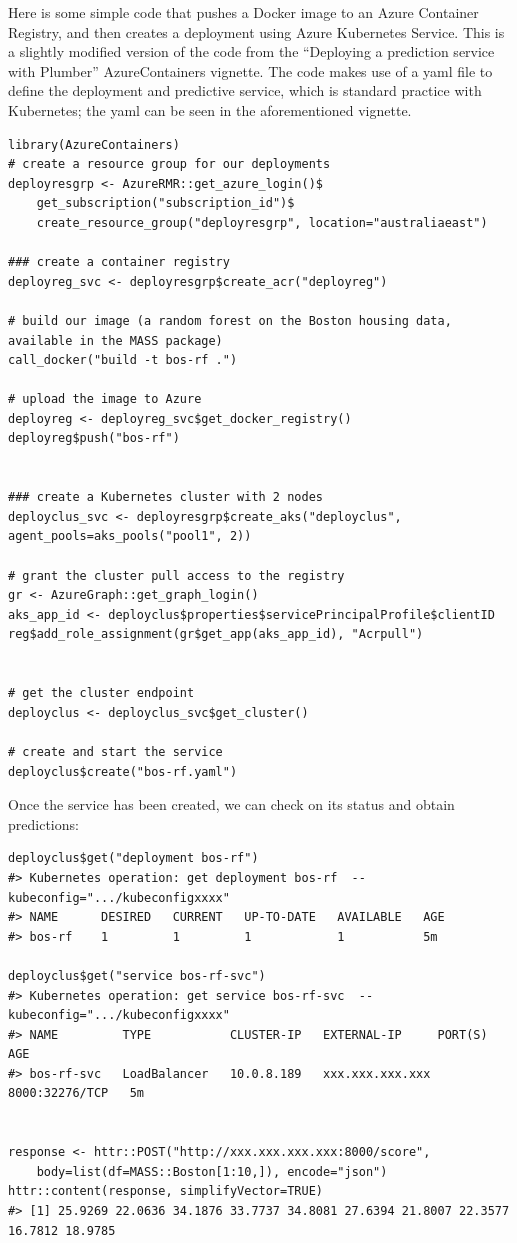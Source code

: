 Here is some simple code that pushes a Docker image to an Azure
Container Registry, and then creates a deployment using Azure Kubernetes
Service. This is a slightly modified version of the code from the
``Deploying a prediction service with Plumber'' AzureContainers
vignette. The code makes use of a yaml file to define the deployment and
predictive service, which is standard practice with Kubernetes; the yaml
can be seen in the aforementioned vignette.

\begin{verbatim}
library(AzureContainers)
# create a resource group for our deployments
deployresgrp <- AzureRMR::get_azure_login()$
    get_subscription("subscription_id")$
    create_resource_group("deployresgrp", location="australiaeast")

### create a container registry
deployreg_svc <- deployresgrp$create_acr("deployreg")

# build our image (a random forest on the Boston housing data, available in the MASS package)
call_docker("build -t bos-rf .")

# upload the image to Azure
deployreg <- deployreg_svc$get_docker_registry()
deployreg$push("bos-rf")


### create a Kubernetes cluster with 2 nodes
deployclus_svc <- deployresgrp$create_aks("deployclus", agent_pools=aks_pools("pool1", 2))

# grant the cluster pull access to the registry
gr <- AzureGraph::get_graph_login()
aks_app_id <- deployclus$properties$servicePrincipalProfile$clientID
reg$add_role_assignment(gr$get_app(aks_app_id), "Acrpull")


# get the cluster endpoint
deployclus <- deployclus_svc$get_cluster()

# create and start the service
deployclus$create("bos-rf.yaml")
\end{verbatim}

Once the service has been created, we can check on its status and obtain
predictions:

\begin{verbatim}
deployclus$get("deployment bos-rf")
#> Kubernetes operation: get deployment bos-rf  --kubeconfig=".../kubeconfigxxxx"
#> NAME      DESIRED   CURRENT   UP-TO-DATE   AVAILABLE   AGE
#> bos-rf    1         1         1            1           5m

deployclus$get("service bos-rf-svc")
#> Kubernetes operation: get service bos-rf-svc  --kubeconfig=".../kubeconfigxxxx"
#> NAME         TYPE           CLUSTER-IP   EXTERNAL-IP     PORT(S)          AGE
#> bos-rf-svc   LoadBalancer   10.0.8.189   xxx.xxx.xxx.xxx 8000:32276/TCP   5m 


response <- httr::POST("http://xxx.xxx.xxx.xxx:8000/score",
    body=list(df=MASS::Boston[1:10,]), encode="json")
httr::content(response, simplifyVector=TRUE)
#> [1] 25.9269 22.0636 34.1876 33.7737 34.8081 27.6394 21.8007 22.3577 16.7812 18.9785
\end{verbatim}

